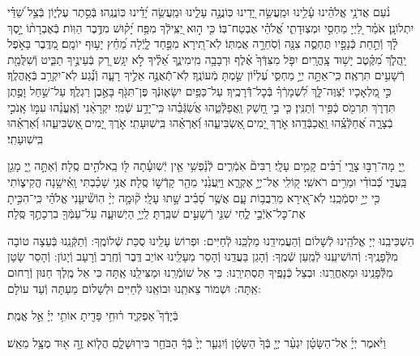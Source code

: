 \documentclass[twoside, openany, parskip=half, 11pt]{book}
\begin{document}
נֹ֨עַם אֲדֹנָ֥י אֱלֹהֵ֗ינוּ עָ֫לֵ֥ינוּ וּמַֽעֲשֵׂ֣ה יָ֭דֵינוּ כּֽוֹנֲנָ֣ה עָלֵ֑ינוּ וּמַֽעֲשֵׂ֥ה יָ֝דֵ֗ינוּ כּֽוֹנֲנֵֽהוּ׃
בְּֿסֵ֣תֶר עֶלְי֑וֹן בְּֿצֵ֥ל שַׁ֝דַּ֗י יִתְלוֹנָֽן׃
אֹמַ֗ר לַ֭יְיָ מַחְסִ֣י וּמְצֽוּדָתִ֑י אֱ֝לֹהַ֗י אֶבְטַח־בּֽוֹ׃
כִּ֤י ה֣וּא יַ֭צִּֽילְֿךָ מִפַּ֥ח יָ֝ק֗וּשׁ מִדֶּ֥בֶר הַוּֽוֹת׃
בְּֿאֶבְרָת֨וֹ יָ֣סֶךְ לָ֗ךְ וְֿתַ֣חַת כְּֿנָפָ֣יו תֶּחְסֶ֑ה צִנָּ֖ה וְֿסֹֽחֵרָ֣ה אֲמִתּֽוֹ׃
לֹֽא־תִ֭ירָא מִפַּ֣חַד לָ֑יְֿלָה מֵ֝חֵ֗ץ יָע֥וּף יוֹמָֽם׃
מִ֭דֶּֽבֶר בָּאֹ֣פֶל יַֽהֲלֹ֑ךְ מִ֝קֶּ֗טֶב יָשׁ֥וּד צָֽהֳרָֽיִם׃
יִפֹּ֤ל מִצִּדְּֿךָ֙ אֶ֗לֶף וּרְבָבָ֥ה מִֽימִינֶ֑ךָ אֵ֝לֶ֗יךָ לֹ֣א יִגָּֽשׁ׃
רַ֭ק בְּֿעֵינֶ֣יךָ תַבִּ֑יט וְֿשִׁלֻּמַ֖ת רְֿשָׁעִ֣ים תִּרְאֶֽה׃
כִּֽי־אַתָּ֣ה יְיָ֣ מַחְסִּ֑י עֶ֝לְי֗וֹן שַׂ֣מְתָּ מְֿעוֹנֶֽךָ׃
לֹֽא־תְֿֿאֻנֶּ֣ה אֵלֶ֣יךָ רָעָ֑ה וְֿנֶ֗֝גַע לֹֽא־יִקְרַ֥ב בְּֿאָֽהֳלֶֽךָ׃
כִּ֣י מַ֭לְאָכָיו יְֿצַוֶּה־לָּ֑ךְ לִ֝שְׁמָרְֿךָ֗ בְּֿכׇל־דְּֿֿרָכֶֽיךָ׃
עַל־כַּפַּ֥יִם יִשָּׂא֑וּנְֿךָ פֶּן־תִּגֹּ֖ף בָּאֶ֣בֶן רַגְלֶֽךָ׃
עַל־שַׁ֣חַל וָפֶ֣תֶן תִּדְרֹ֑ךְ תִּרְמֹ֖ס כְּֿפִ֣יר וְֿתַנִּֽין׃
כִּ֤י בִ֣י חָ֭שַׁק וַֽאֲפַלְּֿטֵ֑הוּ אֲשַׂ֝גְּֿבֵ֗הוּ כִּֽי־יָדַ֥ע שְֿׁמִֽי׃
יִקְרָאֵ֨נִי וְֽֿאֶֽעֱנֵ֗הוּ עִמּ֣וֹ אָֽנֹכִ֣י בְֿצָרָ֑ה אֲ֝חַלְּֿצֵֽ֗הוּ וַֽאֲכַבְּֿדֵֽהוּ׃
אֹ֣רֶךְ יָ֭מִים ֖אַשְׂבִּיעֵ֑הוּ וְֿ֝אַרְאֵ֗הוּ בִּֽישֽׁוּעָתִֽי׃
אֹ֣רֶךְ יָ֭מִים ֖אַשְׂבִּיעֵ֑הוּ וְֿ֝אַרְאֵ֗הוּ בִּֽישֽׁוּעָתִֽי׃

יְ֖יָ מָה־רַבּ֣וּ צָרָ֑י רַ֝בִּ֗ים קָמִ֥ים עָלָֽי׃ רַבִּים֘ אֹֽמְֿרִ֢ים לְֿנַ֫פְשִׁ֥י אֵ֤ין יְֿשֽׁוּעָ֓תָה לּ֖וֹ בֵֽאלֹהִ֣ים סֶֽלָה׃ וְֿאַתָּ֣ה יְ֖יָ מָגֵ֥ן בַּֽעֲדִ֑י כְּֿ֝בוֹדִ֗י וּמֵרִ֥ים רֹאשִֽׁי׃ ק֭וֹלִֽי אֶל־יְיָ֣ אֶקְרָ֑א וַיַּֽעֲנֵ֙נִי מֵהַ֖ר קָדְֿשׁ֣וֹ סֶֽלָה׃ אֲנִ֥י שָׁכַ֗בְתִּי וָֽאִ֫ישָׁ֥נָה הֱקִיצ֑וֹתִי כִּ֖י יְיָ֣ יִסְמְֿכֵֽנִי׃ לֹֽא־אִ֭ירָא מֵרִֽבֲב֥וֹת עָ֑ם אֲשֶׁ֥ר סָ֝בִ֗יב שָׁ֣תוּ עָלָֽי׃ ק֘וּמָ֤ה יְיָ֨ הֽוֹשִׁ֘יעֵ֤נִי אֱלֹהַ֗י כִּֽי־הִכִּ֣יתָ אֶת־כׇּל־אֹֽיְֿבַ֣י לֶ֑חִי שִׁנֵּ֖י רְֿשָׁעִ֣ים שִׁבַּֽרְתָּ׃ לַֽיְיָ֥ הַיְשׁוּעָ֑ה עַל־עַמְּֿךָ֖ בִרְכָתֶ֣ךָ סֶּֽלָה׃

הַשְׁכִּיבֵֽנוּ יְיָ אֱלֹהֵֽינוּ לְֿשָׁלוֹם וְֿהַעֲמִידֵֽנוּ מַלְכֵּֽנוּ לְֿחַיִּים: וּפְרוֹשׂ עָלֵֽינוּ סֻכַּת שְֿׁלוֹמֶֽךָ: וְֿתַקְּֿנֵֽנוּ בְּֿעֵצָה טוֹבָה מִלְּֿפָנֶֽיךָ: וְֿהוֹשִׁיעֵֽנוּ לְֿמַֽעַן שְֿׁמֶֽךָ: וְֿהָגֵן בַּעֲדֵֽנוּ וְֿהָסֵר מֵעָלֵֽינוּ אוֹיֵב דֶּֽבֶר וְֿחֶֽרֶב וְֿרָעָב וְֿיָגוֹן: וְֿהָסֵר שָׂטָן מִלְּֿֿפָנֵֽינוּ וּמֵאַחֲרֵֽנוּ: וּבְצֵל כְּֿנָפֶֽיךָ תַּסְתִּירֵֽנוּ: כִּי אֵל שׁוֹמְֿרֵֽנוּ וּמַצִּילֵֽנוּ אַֽתָּה כִּי אֵל מֶֽלֶךְ חַנּוּן וְֿרַחוּם אַֽתָּה: וּשְׁמוֹר צֵאתֵֽנוּ וּבוֹאֵֽנוּ לְֿחַיִּים וּלְשָׁלוֹם מֵעַתָּה וְֿעַד עוֹלָם:

בְּֿיָדְֿךָ֮ אַפְקִ֢יד ר֫וּחִ֥י פָּדִ֖יתָ אוֹתִ֥י יְיָ֗ אֵ֣ל אֱמֶֽת׃

וַיֹּ֨אמֶר יְיָ֜ אֶל־הַשָּׂטָ֗ן יִגְעַ֨ר יְיָ֤ בְּֿךָ֙ הַשָּׂטָ֔ן וְֿיִגְעַ֤ר יְיָ֙ בְּֿךָ֔ הַבֹּחֵ֖ר בִּירֽוּשָׁלָ֑םִ הֲל֧וֹא זֶ֦ה א֖וּד מֻצָּ֥ל מֵאֵֽשׁ׃
\end{document}

